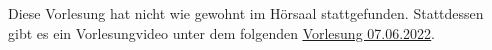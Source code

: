 Diese Vorlesung hat nicht wie gewohnt im Hörsaal stattgefunden. 
Stattdessen gibt es ein Vorlesungvideo unter dem folgenden 
\href{https://ls2-web.cs.tu-dortmund.de/~mamicoja/dap2/videos/lec_dijkstra.mp4}{\underline{Vorlesung 07.06.2022}}.